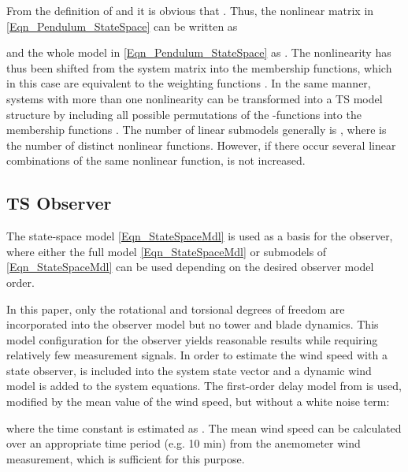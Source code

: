 \documentclass[a4paper]{article}
\begin{document}
From the definition of  and  it is obvious that . Thus, the nonlinear matrix  in \eqref{Eqn_Pendulum_StateSpace} can be written as


\newline and the whole model in \eqref{Eqn_Pendulum_StateSpace} as .
\newline The nonlinearity has thus been shifted from the system matrix into the membership functions, which in this case are equivalent to the weighting functions . In the same manner, systems with more than one nonlinearity can be transformed into a TS model structure by including all possible permutations of the -functions into the membership functions . The number  of linear submodels generally is , where  is the number of distinct nonlinear functions. However, if there occur several linear combinations of the same nonlinear function,  is not increased.



\subsection{TS Observer}


The state-space model \eqref{Eqn_StateSpaceMdl} is used as a basis for the observer, where either the full model \eqref{Eqn_StateSpaceMdl} or submodels of \eqref{Eqn_StateSpaceMdl} can be used depending on the desired observer model order.

In this paper, only the rotational and torsional degrees of freedom are incorporated into the observer model but no tower and blade dynamics. This model configuration for the observer yields reasonable results while requiring relatively few measurement signals.
\newline In order to estimate the wind speed  with a state observer,  is included into the system state vector  and a dynamic wind model is added to the system equations. The first-order delay model from \cite{Ekelund:1994} is used, modified by the mean value  of the wind speed, but without a white noise term:


\newline where the time constant is estimated as . The mean wind speed  can be calculated over an appropriate time period (e.g. 10 min) from the anemometer wind measurement, which is sufficient for this purpose.
\end{document}
